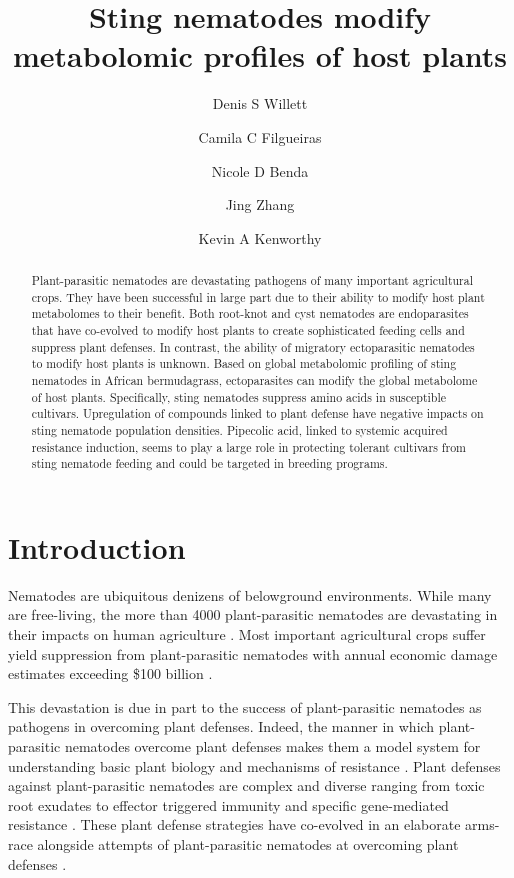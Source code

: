 \documentclass[9pt,lineno]{elife}
\title{Sting nematodes modify metabolomic profiles of host plants}
\author[1*,\authfn{1}]{Denis S Willett}
\author[1,\authfn{1}]{Camila C Filgueiras}
\author[2]{Nicole D Benda}
\author[2]{Jing Zhang}
\author[3]{Kevin A Kenworthy}
\affil[1]{Applied Chemical Ecology Technology, Department of Entomology, Cornell AgriTech}
\affil[2]{Entomology and Nemotalogy Department, University of Florida}
\affil[3]{Agronomy Department, University of Florida}
\begin{document}
\maketitle

\begin{abstract}
Plant-parasitic nematodes are devastating pathogens of many important agricultural crops.  They have been successful in large part due to their ability to modify host plant metabolomes to their benefit.  Both root-knot and cyst nematodes are endoparasites that have co-evolved to modify host plants to create sophisticated feeding cells and suppress plant defenses. In contrast, the ability of migratory ectoparasitic nematodes to modify host plants is unknown.  Based on global metabolomic profiling of sting nematodes in African bermudagrass, ectoparasites can modify the global metabolome of host plants.  Specifically, sting nematodes suppress amino acids in susceptible cultivars.  Upregulation of compounds linked to plant defense have negative impacts on sting nematode population densities.  Pipecolic acid, linked to systemic acquired resistance induction, seems to play a large role in protecting tolerant cultivars from sting nematode feeding and could be targeted in breeding programs.  
\end{abstract}


\section{Introduction}

Nematodes are ubiquitous denizens of belowground environments.  While many are free-living, the more than 4000 plant-parasitic nematodes are devastating in their impacts on human agriculture \citep{jones2013top,moens}. Most important agricultural crops suffer yield suppression from plant-parasitic nematodes with annual economic damage estimates exceeding \$100 billion \citep{jones2013top, williamson2006nematode}.  

This devastation is due in part to the success of plant-parasitic nematodes as pathogens in overcoming plant defenses.  Indeed, the manner in which plant-parasitic nematodes overcome plant defenses makes them a model system for understanding basic plant biology and mechanisms of resistance \citep{opperman1998soybean,williamson2006nematode}.  Plant defenses against plant-parasitic nematodes are complex and diverse ranging from toxic root exudates to effector triggered immunity and specific gene-mediated resistance \citep{yeates1987plants, williamson2006nematode}.  These plant defense strategies have co-evolved in an elaborate arms-race alongside attempts of plant-parasitic nematodes at overcoming plant defenses \citep{stone1985co,williamson2006nematode,zacheo1995plant}.  
\end{document}
